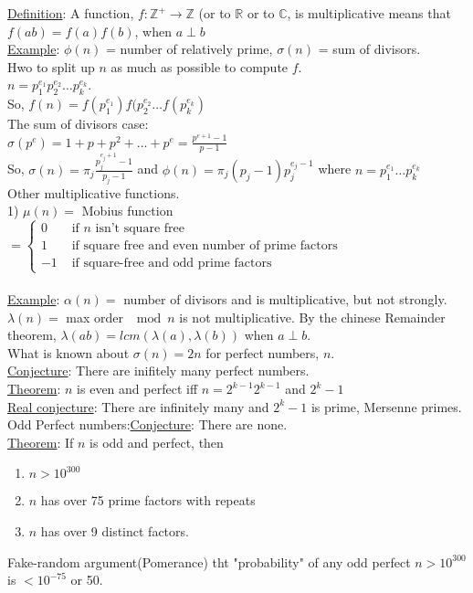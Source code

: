 \documentclass[13pt]{article}
\begin{document}
	\underline{Definition}: A function, $f: \mathbb{Z}^+ \to \mathbb{Z}$ 
	(or to $\mathbb{R}$ or to $\mathbb{C}$, is multiplicative means that $f(ab) =
	f(a)f(b)$, when $a \perp b$\\
	\underline{Example}: $\phi(n)$ = number of relatively prime, $\sigma(n)$ = 
	sum of divisors.\\
	Hwo to split up $n$ as much as possible to compute $f$.\\
	$n = p_1^{e_1} p_2^{e_2}\ldots p_k^{e_k}$.\\
	So, $f(n) = f(p_1^{e_1})f(p_2^{e_2}\ldots f(p_k^{e_k})$\\
	The sum of divisors case:\\
	$\sigma(p^{e}) = 1 + p + p^2 + \ldots + p^e = \frac{p^{e+1} - 1}{p-1}$\\
	So, $\sigma(n) = \pi_{j} \frac{p_j^{e_j + 1} - 1}{p_j - 1}$ and $\phi(n) =
	\pi_{j} (p_j - 1)p_j^{e_j - 1}$ where $n = p_1^{e_1}\ldots p_k^{e_k}$\\
	Other multiplicative functions.\\
	1) $\mu(n) = $ Mobius function $ = \begin{cases} 0 & \text{ if } n 
	\text{ isn't square free}\\ 1 & \text{ if square free and even number of prime
	factors} \\ -1 & \text{ if square-free and odd prime factors} \end{cases}$\\\\
	\underline{Example}: $\alpha(n) = $ number of divisors and is multiplicative, but
	not strongly. $\lambda(n) = $ max order $\mod n$ is not multiplicative. By the
	chinese Remainder theorem, $\lambda(ab) = lcm(\lambda(a), \lambda(b))$ when
	$a \perp b$. \\
	What is known about $\sigma(n) = 2n$ for perfect numbers, $n$.\\
	\underline{Conjecture}: There are inifitely many perfect numbers.\\
	\underline{Theorem}: $n$ is even and perfect iff $n = 2^{k - 1}2^{k-1}$ and
	$2^k - 1$\\
	\underline{Real conjecture}: There are infinitely many and $2^k - 1$ is prime,
	Mersenne primes. \\
	Odd Perfect numbers:\underline{Conjecture}: There are none.\\
	\underline{Theorem}: If $n$ is odd and perfect, then \\
	\begin{enumerate}
		\item $n > 10^{300}$
		\item $n$ has over 75 prime factors with repeats
		\item $n$ has over 9 distinct factors. 
	\end{enumerate}
	Fake-random argument(Pomerance) tht "probability" of any odd perfect $n > 10^300$
	is $< 10^{-75}$ or 50.
\end{document}

